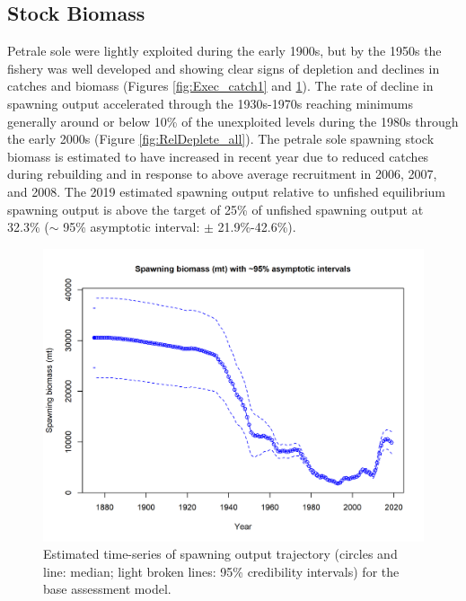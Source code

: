 \documentclass[12pt,]{article}
\begin{document}
\subsection*{Stock Biomass}\label{stock-biomass}

Petrale sole were lightly exploited during the early 1900s, but by the
1950s the fishery was well developed and showing clear signs of
depletion and declines in catches and biomass (Figures
\ref{fig:Exec_catch1} and \ref{fig:Spawnbio_all}). The rate of decline
in spawning output accelerated through the 1930s-1970s reaching minimums
generally around or below 10\% of the unexploited levels during the
1980s through the early 2000s (Figure \ref{fig:RelDeplete_all}). The
petrale sole spawning stock biomass is estimated to have increased in
recent year due to reduced catches during rebuilding and in response to
above average recruitment in 2006, 2007, and 2008. The 2019 estimated
spawning output relative to unfished equilibrium spawning output is
above the target of 25\% of unfished spawning output at 32.3\% (\(\sim\)
95\% asymptotic interval: \(\pm\) 21.9\%-42.6\%).

\begin{figure}
\centering
\includegraphics{r4ss/plots_mod1/ts7_Spawning_biomass_(mt)_with_95_asymptotic_intervals_intervals.png}
\caption{Estimated time-series of spawning output trajectory (circles
and line: median; light broken lines: 95\% credibility intervals) for
the base assessment model. \label{fig:Spawnbio_all}}
\end{figure}
\end{document}
